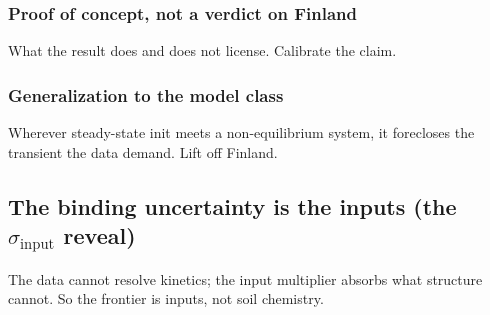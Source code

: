 \documentclass[11pt]{article}
\begin{document}
\subsubsection{Proof of concept, not a verdict on Finland}
What the result does and does not license. Calibrate the claim.

\subsubsection{Generalization to the model class}
Wherever steady-state init meets a non-equilibrium system, it forecloses the
transient the data demand. Lift off Finland.

\subsection{The binding uncertainty is the inputs (the $\sigma_{\mathrm{input}}$ reveal)}
The data cannot resolve kinetics; the input multiplier absorbs what structure
cannot. So the frontier is inputs, not soil chemistry.
\end{document}
